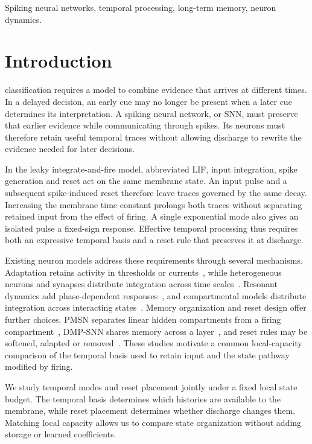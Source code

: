 \documentclass[letterpaper,journal]{IEEEtran}
\begin{document}
\begin{IEEEkeywords}
Spiking neural networks, temporal processing, long-term memory, neuron dynamics.
\end{IEEEkeywords}

\section{Introduction}
\label{sec:introduction}

 classification requires a model to combine evidence that arrives at different times. In a delayed decision, an early cue may no longer be present when a later cue determines its interpretation. A spiking neural network, or SNN, must preserve that earlier evidence while communicating through spikes. Its neurons must therefore retain useful temporal traces without allowing discharge to rewrite the evidence needed for later decisions.

In the leaky integrate-and-fire model, abbreviated LIF, input integration, spike generation and reset act on the same membrane state. An input pulse and a subsequent spike-induced reset therefore leave traces governed by the same decay. Increasing the membrane time constant prolongs both traces without separating retained input from the effect of firing. A single exponential mode also gives an isolated pulse a fixed-sign response. Effective temporal processing thus requires both an expressive temporal basis and a reset rule that preserves it at discharge.

Existing neuron models address these requirements through several mechanisms. Adaptation retains activity in thresholds or currents~\cite{asrnn,adlif,radlif}, while heterogeneous neurons and synapses distribute integration across time scales~\cite{heterogeneity,hetsyn}. Resonant dynamics add phase-dependent responses~\cite{izhikevich_rf,brf,drf}, and compartmental models distribute integration across interacting states~\cite{tclif,dhsnn}. Memory organization and reset design offer further choices. PMSN separates linear hidden compartments from a firing compartment~\cite{pmsn2026}, DMP-SNN shares memory across a layer~\cite{sun2026dmp}, and reset rules may be softened, adapted or removed~\cite{inflor,arlif,psn}. These studies motivate a common local-capacity comparison of the temporal basis used to retain input and the state pathway modified by firing.

We study temporal modes and reset placement jointly under a fixed local state budget. The temporal basis determines which histories are available to the membrane, while reset placement determines whether discharge changes them. Matching local capacity allows us to compare state organization without adding storage or learned coefficients.
\end{document}
